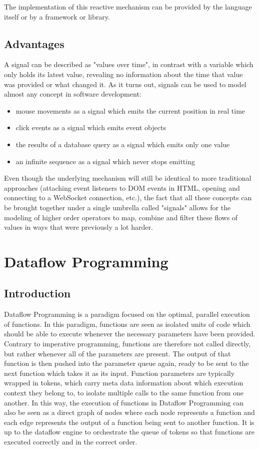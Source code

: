 The implementation of this reactive mechanism can be provided by the language itself or by a framework or library. 

\subsection{Advantages}

A signal can be described as "values over time", in contrast with a variable which only holds its latest value, revealing no information about the time that value was provided or what changed it. 
As it turns out, signals can be used to model almost any concept in software development:
\begin{itemize}
	\item mouse movements as a signal which emits the current position in real time
	\item click events as a signal which emits event objects
	\item the results of a database query as a signal which emits only one value
    \item an infinite sequence as a signal which never stops emitting
\end{itemize}

Even though the underlying mechanism will still be identical to more traditional approaches (attaching event listeners to DOM events in HTML, opening and connecting to a WebSocket connection, etc.), the fact that all these concepts can be brought together under a single umbrella called "signals" allows for the modeling of higher order operators to map, combine and filter these flows of values in ways that were previously a lot harder.

\section{Dataflow Programming}

\subsection{Introduction}

Dataflow Programming is a paradigm focused on the optimal, parallel execution of functions. In this paradigm, functions are seen as isolated units of code which should be able to execute whenever the necessary parameters have been provided. Contrary to imperative programming, functions are therefore not called directly, but rather whenever all of the parameters are present. 
The output of that function is then pushed into the parameter queue again, ready to be sent to the next function which takes it as its input. Function parameters are typically wrapped in tokens, which carry meta data information about which execution context they belong to, to isolate multiple calls to the same function from one another. 
In this way, the execution of functions in Dataflow Programming can also be seen as a direct graph of nodes where each node represents a function and each edge represents the output of a function being sent to another function. It is up to the dataflow engine to orchestrate the queue of tokens so that functions are executed correctly and in the correct order.

